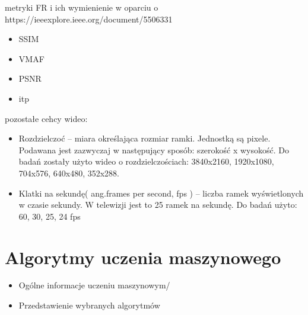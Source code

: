 
metryki FR i ich wymienienie w oparciu o https://ieeexplore.ieee.org/document/5506331

\begin{itemize}[label=$\bullet$]
\item SSIM
\item VMAF
\item PSNR
\item itp
\end{itemize}

pozostałe cehcy wideo: 

\begin{itemize}[label=$\bullet$]
\item Rozdzielczoć -- miara określająca rozmiar ramki. Jednostką są pixele. Podawana jest zazwyczaj w następujący sposób: szerokość x wysokość. Do badań zostały użyto wideo o rozdzielczościach: 3840x2160, 1920x1080, 704x576, 640x480, 352x288. 
\item Klatki na sekundę( ang.frames per second, fps ) -- liczba ramek wyświetlonych w czasie sekundy. W telewizji jest to 25 ramek na sekundę. Do badań użyto: 60, 30, 25, 24 fps
\end{itemize}

\section{Algorytmy uczenia maszynowego }
\label{cha:pierwszyDokument}

\begin{itemize}
\item Ogólne informacje uczeniu maszynowym/
\item Przedstawienie wybranych algorytmów 
\end{itemize}


